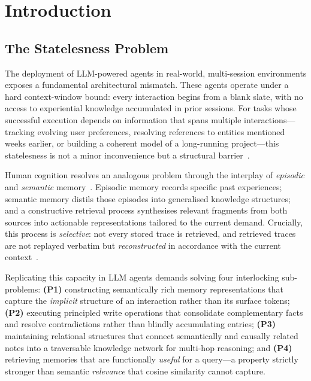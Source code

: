 \documentclass{article}
\begin{document}
\section{Introduction}
\label{sec:introduction}

\subsection{The Statelesness Problem}
\label{subsec:statelesness}

The deployment of LLM-powered agents in real-world, multi-session environments
exposes a fundamental architectural mismatch.
These agents operate under a hard context-window bound: every interaction
begins from a blank slate, with no access to experiential knowledge accumulated
in prior sessions.
For tasks whose successful execution depends on information that spans multiple
interactions---tracking evolving user preferences, resolving references to
entities mentioned weeks earlier, or building a coherent model of a
long-running project---this statelesness is not a minor inconvenience but a
structural barrier~\cite{wu2024longmemeval, maharana2024locomo}.

Human cognition resolves an analogous problem through the interplay of
\emph{episodic} and \emph{semantic} memory~\cite{tulving1972episodic}.
Episodic memory records specific past experiences; semantic memory distils
those episodes into generalised knowledge structures; and a constructive
retrieval process synthesises relevant fragments from both sources into
actionable representations tailored to the current demand.
Crucially, this process is \emph{selective}: not every stored trace is
retrieved, and retrieved traces are not replayed verbatim but
\emph{reconstructed} in accordance with the current context~\cite{schacter2007constructive}.

Replicating this capacity in LLM agents demands solving four interlocking
sub-problems:
\textbf{(P1)} constructing semantically rich memory representations that
capture the \emph{implicit} structure of an interaction rather than its
surface tokens;
\textbf{(P2)} executing principled write operations that consolidate
complementary facts and resolve contradictions rather than blindly accumulating
entries;
\textbf{(P3)} maintaining relational structures that connect semantically and
causally related notes into a traversable knowledge network for multi-hop
reasoning; and
\textbf{(P4)} retrieving memories that are functionally \emph{useful} for a
query---a property strictly stronger than semantic \emph{relevance} that
cosine similarity cannot capture.
\end{document}
